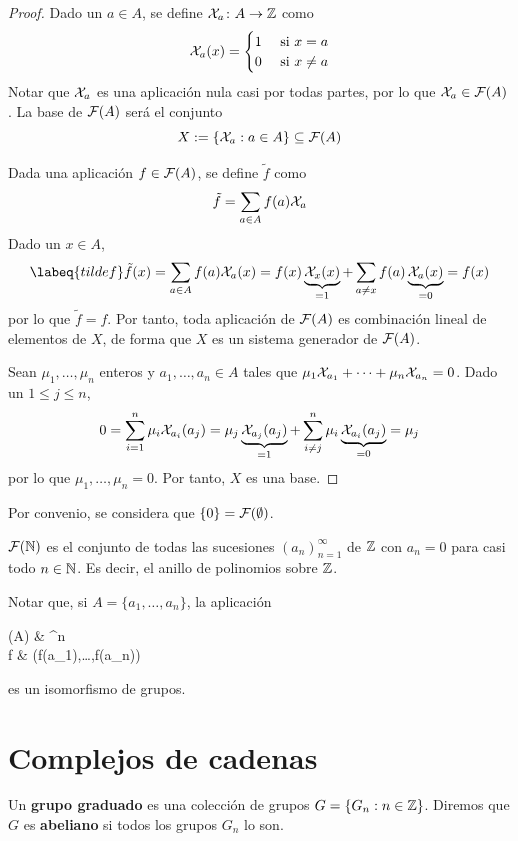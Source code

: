 \begin{proof}
Dado un $a \in A$, se define $\mathcal{X}_a\colon A \to \mathbb{Z}$ como
\[\mathcal{X}_a(x)=\begin{cases}
1&\mbox{ si }x=a\\
0&\mbox{ si }x\neq a
\end{cases}\]
Notar que $\mathcal{X}_a$ es una aplicación nula casi por todas partes, por lo que
$\mathcal{X}_a \in \mathcal{F}(A)$. La base de $\mathcal{F}(A)$ será el conjunto
\[X:=\{\mathcal{X}_a: a\in A\} \subseteq \mathcal{F}(A)\]

Dada una aplicación $f \in \mathcal{F}(A)$, se define $\tilde{f}$ como
\[\tilde{f}=\sum_{a \in A}f(a)\mathcal{X}_a\]
Dado un $x \in A$,
\begin{equation}
\labeq{tildef}\tilde{f}(x)=\sum_{a \in A} f(a)\mc{X}_a(x)=
f(x)\underbrace{\mc{X}_x(x)}_{=1}+
\sum_{a \neq x}f(a)\underbrace{\mc{X}_a(x)}_{=0}=f(x)
\end{equation}
por lo que $\tilde{f}=f$. Por tanto, toda aplicación de $\mathcal{F}(A)$ es
combinación lineal de elementos de $X$, de forma que $X$ es un sistema generador
de $\mathcal{F}(A)$.

Sean $\mu_1,\dots,\mu_n$ enteros y $a_1,\dots,a_n \in A$ tales que
$\mu_1\mathcal{X}_{a_1}+\dots+\mu_n\mathcal{X}_{a_n}=0$. Dado un $1 \leq j \leq n$,
\[0=\sum^n_{i=1}\mu_i\mathcal{X}_{a_i}(a_j)=
\mu_j\underbrace{\mathcal{X}_{a_j}(a_j)}_{=1}+
\sum^n_{i \neq j}\mu_i\underbrace{\mathcal{X}_{a_i}(a_j)}_{=0}=\mu_j\]
por lo que $\mu_1,\dots,\mu_n=0$. Por tanto, $X$ es una base.
\end{proof}

Por convenio, se considera que $\{0\}=\mathcal{F}(\emptyset)$.

\begin{ejem}
$\mathcal{F}(\mathbb{N})$ es el conjunto de todas las sucesiones $(a_n)_{n=1}^\infty$
de $\mathbb{Z}$ con $a_n=0$ para casi todo $n \in \mathbb{N}$. Es decir, el anillo de
polinomios sobre $\mathbb{Z}$.
\end{ejem}

Notar que, si $A=\{a_1,\dots,a_n\}$, la aplicación
\begin{diag}
\Psi\colon {}(A) \arrow[r]	& ^n\\[-0.8cm]
f \arrow[maps to,r]			& (f(a_1),\dots,f(a_n))
\end{diag}
es un isomorfismo de grupos.

\section{Complejos de cadenas}
\begin{definition}
Un \textbf{grupo graduado} es una colección de grupos $G=\{G_n: n \in \mathbb{Z}\}$.
Diremos que $G$ es \textbf{abeliano} si todos los grupos $G_n$ lo son.
\end{definition}


